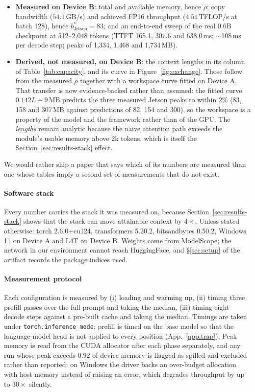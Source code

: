 \documentclass[5p]{elsarticle}
\newcommand{\rhoSym}{\rho}
\begin{document}
\begin{itemize}
\item \textbf{Measured on Device B}: total and available memory, hence
      $\rhoSym$; copy bandwidth ($54.1$\,GB/s) and achieved FP16 throughput
      ($4.51$\,TFLOP/s at batch 128), hence $b^*_{\mathrm{Jetson}}{=}83$; and an
      end-to-end sweep of the real 0.6B checkpoint at 512--2{,}048 tokens
      (TTFT 165.1, 307.6 and 638.0\,ms; $\sim$108\,ms per decode step; peaks of
      1{,}334, 1{,}468 and 1{,}734\,MB).
\item \textbf{Derived, not measured, on Device B}: the context lengths in its
      column of Table~\ref{tab:capacity}, and its curve in
      Figure~\ref{fig:exchange}. Those follow from the measured $\rhoSym$
      together with a workspace curve fitted on Device A. That transfer is now
      evidence-backed rather than assumed: the fitted curve $0.142L+9$\,MB
      predicts the three measured Jetson peaks to within $2\%$ (83, 158 and
      307\,MB against predictions of 82, 154 and 300), so the workspace is a
      property of the model and the framework rather than of the GPU. The
      \emph{lengths} remain analytic because the naive attention path exceeds
      the module's usable memory above 2k tokens, which is itself the
      Section~\ref{sec:results-stack} effect.
\end{itemize}

We would rather ship a paper that says which of its numbers are measured than one
whose tables imply a second set of measurements that do not exist.

\paragraph*{Software stack}
Every number carries the stack it was measured on, because
Section~\ref{sec:results-stack} shows that the stack can move attainable context
by $4\times$. Unless stated otherwise: torch 2.6.0+cu124, transformers 5.20.2,
bitsandbytes 0.50.2, Windows 11 on Device A and L4T on Device B. Weights come
from ModelScope; the network in our environment cannot reach HuggingFace, and
\S\ref{sec:setup} of the artifact records the package indices used.

\paragraph*{Measurement protocol}
Each configuration is measured by (i) loading and warming up, (ii) timing three
prefill passes over the full prompt and taking the median, (iii) timing eight
decode steps against a pre-built cache and taking the median. Timings are taken
under \texttt{torch.inference\_mode}; prefill is timed on the base model so that
the language-model head is not applied to every position
(App.~\ref{app:trap}). Peak memory is read from the CUDA allocator after each
phase separately, and any run whose peak exceeds $0.92$ of device memory is
flagged as spilled and excluded rather than reported: on Windows the driver backs
an over-budget allocation with host memory instead of raising an error, which
degrades throughput by up to $30\times$ silently.
\end{document}
